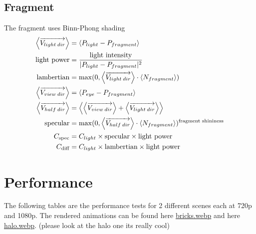 \documentclass[12pt]{article}
\begin{document}
\subsection{Fragment}
The fragment uses Binn-Phong shading 
\begin{gather*}\begin{aligned}
		\left\langle \overrightarrow{V_{light\hspace{0.2em}dir}} \right\rangle
			&=
			\left\langle P_{light}-P_{fragment}\right\rangle \notag\\
		\text{light power} 
			&= 
			\frac{\text{light intensity}}{| P_{light}-P_{fragment}|^2}\\
		\text{lambertian} 
			&= \max(0, \left\langle 
			\overrightarrow{V_{light\hspace{0.2em}dir}} \right\rangle \cdot   \left\langle N_{fragment}\right\rangle) \\
		\left\langle\overrightarrow{V_{view\hspace{0.2em}dir}} \right\rangle 
		&= 
		\left\langle P_{eye}-P_{fragment}\right\rangle\\
		\left\langle\overrightarrow{V_{half\hspace{0.2em}dir}} \right\rangle 
		&= 
			\left\langle 
				\left\langle\overrightarrow{V_{view\hspace{0.2em}dir}} \right\rangle
				+
				\left\langle \overrightarrow{V_{light\hspace{0.2em}dir}}  \right\rangle
			\right\rangle \\
		\text{specular} &= \max(0, 
			\left\langle\overrightarrow{V_{half\hspace{0.2em}dir}} \right\rangle
			\cdot
			\left\langle N_{fragment}\right\rangle			
		)^{\text{fragment shininess}}\\
		C_{\text{spec}} &= C_{light}\times \text{specular} \times \text{light power}\\
		C_{\text{diff}} &= C_{light}\times \text{lambertian} \times \text{light power}
\end{aligned}\end{gather*}


\section{Performance}
The following tables are the performance tests for 2 different scenes each at 720p and 1080p. The rendered animations can be found here
\href{https://github.com/ParkerTenBroeck/3P93/blob/dff1995021a7f66e8c5a2a137551acbd2b20739f/p2/code/examples/bricks.webp}{bricks.webp}
and here
\href{https://github.com/ParkerTenBroeck/3P93/blob/dff1995021a7f66e8c5a2a137551acbd2b20739f/p2/code/examples/halo.webp}{halo.webp}. (please look at the halo one its really cool)
\end{document}
